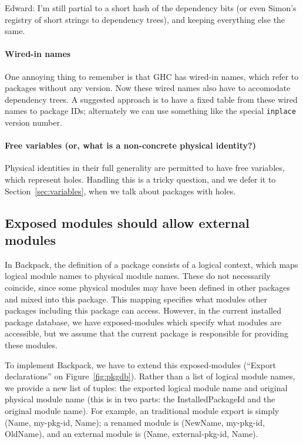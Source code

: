 \documentclass{article}
\begin{document}
Edward: I'm still partial to a short hash of the dependency bits (or
even Simon's registry of short strings to dependency trees), and keeping
everything else the same.

\paragraph{Wired-in names} One annoying thing to remember is that GHC
has wired-in names, which refer to packages without any version.  Now
these wired names also have to accomodate dependency trees. A
suggested approach is to have a fixed table from these wired names to
package IDs; alternately we can use something like the special \verb|inplace|
version number.

\paragraph{Free variables (or, what is a non-concrete physical
identity?)} Physical identities in their full generality are permitted
to have free variables, which represent holes.  Handling this is a
tricky question, and we defer it to Section~\ref{sec:variables}, when
we talk about packages with holes.

\subsection{Exposed modules should allow external modules}\label{sec:reexport}

In Backpack, the definition of a package consists of a logical context,
which maps logical module names to physical module names.  These do not
necessarily coincide, since some physical modules may have been defined
in other packages and mixed into this package.  This mapping specifies
what modules other packages including this package can access.
However, in the current installed package database, we have exposed-modules which
specify what modules are accessible, but we assume that the current
package is responsible for providing these modules.

To implement Backpack, we have to extend this exposed-modules (``Export declarations''
on Figure~\ref{fig:pkgdb}).  Rather
than a list of logical module names, we provide a new list of tuples:
the exported logical module name and original physical module name (this
is in two parts: the InstalledPackageId and the original module name).
For example, an traditional module export is simply (Name, my-pkg-id, Name);
a renamed module is (NewName, my-pkg-id, OldName), and an external module
is (Name, external-pkg-id, Name).
\end{document}
